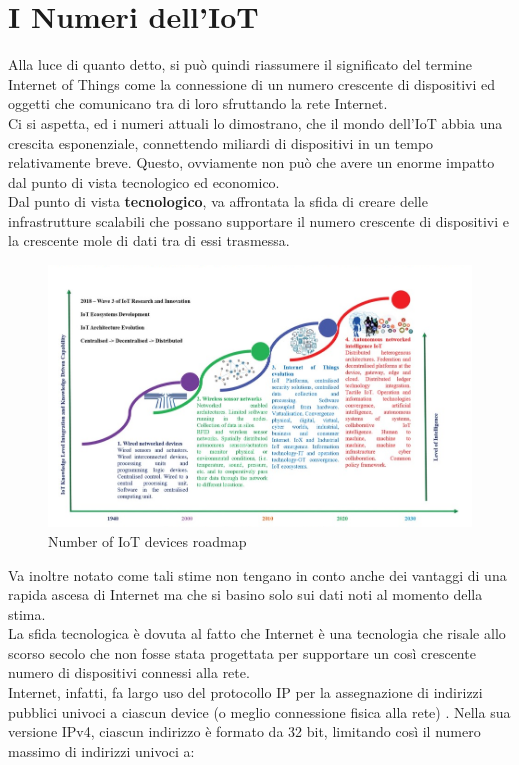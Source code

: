 \section{I Numeri dell'IoT}
\label{sec:i_numeri_dell_iot}
Alla luce di quanto detto, si può quindi riassumere il significato del termine Internet of Things come la connessione di un numero crescente di dispositivi ed oggetti che comunicano tra di loro sfruttando la rete Internet. \cite{famous:paper_full_intro}\\
Ci si aspetta, ed i numeri attuali lo dimostrano, che il mondo dell'IoT abbia una crescita esponenziale, connettendo miliardi di dispositivi in un tempo relativamente breve. Questo, ovviamente non può che avere un enorme impatto dal punto di vista tecnologico ed economico.\\
Dal punto di vista \textbf{tecnologico}, va affrontata la sfida di creare delle infrastrutture scalabili che possano supportare il numero crescente di dispositivi e la crescente mole di dati tra di essi trasmessa. 
\begin{figure}
	\begin{center}
		\includegraphics[width=0.7\columnwidth]{images/iot_tech_data.png}
	\end{center}
	\caption{Number of IoT devices roadmap}
	\label{fig:iot_tech_data}
\end{figure}
Va inoltre notato come tali stime non tengano in conto anche dei vantaggi di una rapida ascesa di Internet ma che si basino solo sui dati noti al momento della stima.\\
La sfida tecnologica è dovuta al fatto che Internet è una tecnologia che risale allo scorso secolo che non fosse stata progettata per supportare un così crescente numero di dispositivi connessi alla rete.\\
Internet, infatti, fa largo uso del protocollo IP per la assegnazione di indirizzi pubblici univoci a ciascun device (o meglio connessione fisica alla rete) . Nella sua versione IPv4, ciascun indirizzo è formato da 32 bit, limitando così il numero massimo di indirizzi univoci a:
